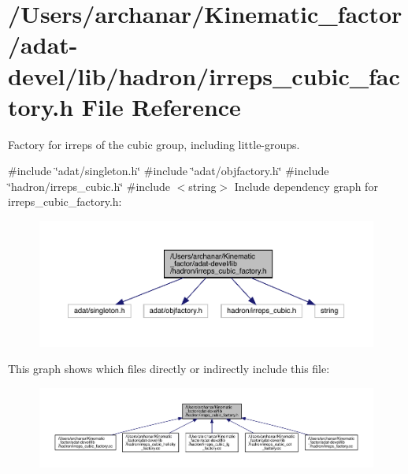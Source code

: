\hypertarget{adat-devel_2lib_2hadron_2irreps__cubic__factory_8h}{}\section{/\+Users/archanar/\+Kinematic\+\_\+factor/adat-\/devel/lib/hadron/irreps\+\_\+cubic\+\_\+factory.h File Reference}
\label{adat-devel_2lib_2hadron_2irreps__cubic__factory_8h}


Factory for irreps of the cubic group, including little-\/groups.  


{\ttfamily \#include \char`\"{}adat/singleton.\+h\char`\"{}}\newline
{\ttfamily \#include \char`\"{}adat/objfactory.\+h\char`\"{}}\newline
{\ttfamily \#include \char`\"{}hadron/irreps\+\_\+cubic.\+h\char`\"{}}\newline
{\ttfamily \#include $<$string$>$}\newline
Include dependency graph for irreps\+\_\+cubic\+\_\+factory.\+h\+:
\nopagebreak
\begin{figure}[H]
\begin{center}
\leavevmode
\includegraphics[width=350pt]{d0/d2b/adat-devel_2lib_2hadron_2irreps__cubic__factory_8h__incl}
\end{center}
\end{figure}
This graph shows which files directly or indirectly include this file\+:
\nopagebreak
\begin{figure}[H]
\begin{center}
\leavevmode
\includegraphics[width=350pt]{d6/d66/adat-devel_2lib_2hadron_2irreps__cubic__factory_8h__dep__incl}
\end{center}
\end{figure}
